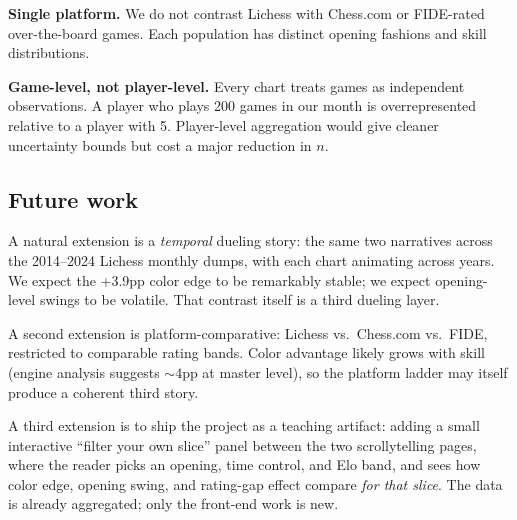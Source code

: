 \documentclass[sigconf,nonacm,natbib=false]{acmart}
\begin{document}
\textbf{Single platform.} We do not contrast Lichess with
Chess.com or FIDE-rated over-the-board games. Each population has
distinct opening fashions and skill distributions.

\textbf{Game-level, not player-level.} Every chart treats games as
independent observations. A player who plays 200 games in our
month is overrepresented relative to a player with 5. Player-level
aggregation would give cleaner uncertainty bounds but cost a major
reduction in $n$.

\subsection{Future work}

A natural extension is a \emph{temporal} dueling story: the same
two narratives across the 2014--2024 Lichess monthly dumps, with
each chart animating across years. We expect the +3.9pp color edge
to be remarkably stable; we expect opening-level swings to be
volatile. That contrast itself is a third dueling layer.

A second extension is platform-comparative: Lichess vs.\ Chess.com
vs.\ FIDE, restricted to comparable rating bands. Color advantage
likely grows with skill (engine analysis suggests $\sim 4$pp at
master level), so the platform ladder may itself produce a
coherent third story.

A third extension is to ship the project as a teaching artifact:
adding a small interactive ``filter your own slice'' panel between
the two scrollytelling pages, where the reader picks an opening,
time control, and Elo band, and sees how color edge, opening
swing, and rating-gap effect compare \emph{for that slice}. The
data is already aggregated; only the front-end work is new.
\end{document}
